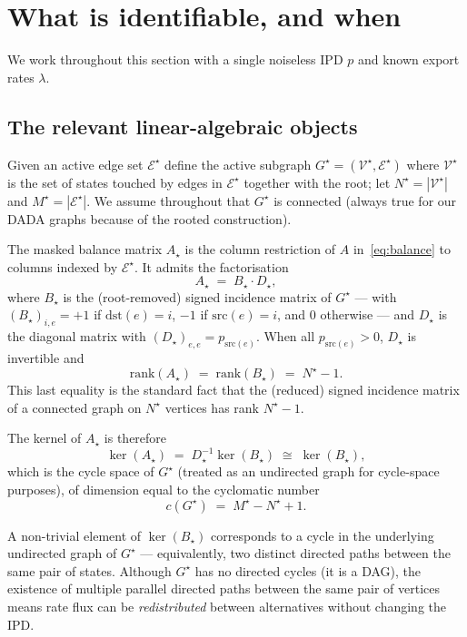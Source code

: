 \documentclass[11pt, a4paper]{article}
\newcommand{\Estar}{\mathcal{E}^{\star}}
\newcommand{\Gstar}{G^{\star}}
\newcommand{\Astar}{A_{\star}}
\newcommand{\Bstar}{B_{\star}}
\newcommand{\Dstar}{D_{\star}}
\begin{document}
\section{What is identifiable, and when}
\label{sec:identifiability}

We work throughout this section with a single noiseless IPD $p$ and known export rates $\lambda$.

\subsection{The relevant linear-algebraic objects}

Given an active edge set $\Estar$ define the active subgraph $\Gstar = (\mathcal{V}^{\star}, \Estar)$ where $\mathcal{V}^{\star}$ is the set of states touched by edges in $\Estar$ together with the root; let $N^{\star} = |\mathcal{V}^{\star}|$ and $M^{\star} = |\Estar|$. We assume throughout that $\Gstar$ is connected (always true for our DADA graphs because of the rooted construction).

The masked balance matrix $\Astar$ is the column restriction of $A$ in~\eqref{eq:balance} to columns indexed by $\Estar$. It admits the factorisation
\[
\Astar \;=\; \Bstar \cdot \Dstar,
\]
where $\Bstar$ is the (root-removed) signed incidence matrix of $\Gstar$ --- with $(\Bstar)_{i, e} = +1$ if $\mathrm{dst}(e) = i$, $-1$ if $\mathrm{src}(e) = i$, and $0$ otherwise --- and $\Dstar$ is the diagonal matrix with $(\Dstar)_{e,e} = p_{\mathrm{src}(e)}$. When all $p_{\mathrm{src}(e)} > 0$, $\Dstar$ is invertible and
\[
\mathrm{rank}(\Astar) \;=\; \mathrm{rank}(\Bstar) \;=\; N^{\star} - 1.
\]
This last equality is the standard fact that the (reduced) signed incidence matrix of a connected graph on $N^{\star}$ vertices has rank $N^{\star} - 1$.

The kernel of $\Astar$ is therefore
\[
\ker(\Astar) \;=\; \Dstar^{-1} \ker(\Bstar) \;\cong\; \ker(\Bstar),
\]
which is the cycle space of $\Gstar$ (treated as an undirected graph for cycle-space purposes), of dimension equal to the cyclomatic number
\begin{equation}
c(\Gstar) \;=\; M^{\star} - N^{\star} + 1.
\label{eq:cyclomatic}
\end{equation}

A non-trivial element of $\ker(\Bstar)$ corresponds to a cycle in the underlying undirected graph of $\Gstar$ --- equivalently, two distinct directed paths between the same pair of states. Although $\Gstar$ has no directed cycles (it is a DAG), the existence of multiple parallel directed paths between the same pair of vertices means rate flux can be \emph{redistributed} between alternatives without changing the IPD.
\end{document}
